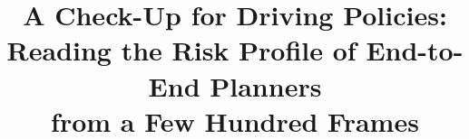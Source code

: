 \documentclass[conference]{IEEEtran}
\begin{document}
\title{A Check-Up for Driving Policies:\\ Reading the Risk Profile of End-to-End Planners\\ from a Few Hundred Frames}
\author{
}
\maketitle












\end{document}
